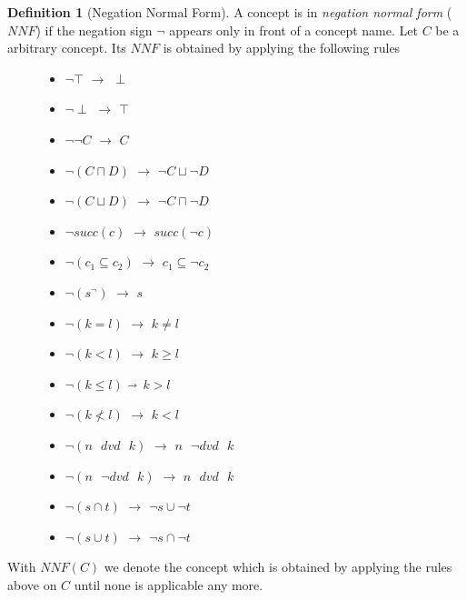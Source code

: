 \documentclass[a4paper,11pt]{scrartcl}
\theoremstyle{break}
\theoremstyle{definition}
\newtheorem{mydef}{Definition}
\begin{document}
\begin{mydef}[Negation Normal Form]
A concept is in \textit{negation normal form} ($NNF$) if the negation sign $\neg$ appears only in front of a concept name. Let $C$ be a arbitrary concept. Its $NNF$ is obtained by applying the following rules
\begin{figure}
\begin{minipage}[t]{.5\textwidth}
\raggedright
\begin{itemize}
\item $\neg\top$ $\rightarrow$ $\perp$
\item $\neg\perp$ $\rightarrow$ $\top$
\item $\neg\neg C$ $\rightarrow$ $C$
\item $\neg(C\sqcap D)$ $\rightarrow$ $\neg C \sqcup \neg D$
\item $\neg(C\sqcup D)$ $\rightarrow$ $\neg C \sqcap \neg D$
\item $\neg succ(c)$ $\rightarrow$ $succ(\neg c)$
\item $\neg (c_1\subseteq c_2)$ $\rightarrow$ $c_1\subseteq \neg c_2$
\item $\neg (s^\neg)$ $\rightarrow$ $s$
\end{itemize}
\end{minipage}%
\begin{minipage}[t]{.5\textwidth}
\raggedleft
\begin{itemize}
\item $\neg (k=l)$ $\rightarrow$ $k\neq l$
\item $\neg (k<l)$ $\rightarrow$ $k\geq l$
\item $\neg (k\leq l)$ $\shortrightarrow$ $k>l$
\item $\neg (k\not<l)$ $\rightarrow$ $k<l$
\item $\neg (n\text{ } dvd \text{ } k)$ $\rightarrow$ $n\text{ } \neg dvd \text{ } k$
\item $\neg (n\text{ } \neg dvd \text{ } k)$ $\rightarrow$ $n\text{ } dvd \text{ } k$
\item $\neg (s\cap t)$ $\rightarrow$ $\neg s \cup \neg t$
\item $\neg (s\cup t)$ $\rightarrow$ $\neg s \cap \neg t$
\end{itemize}
\end{minipage}
\end{figure}
\end{mydef}
With $NNF(C)$ we denote the concept which is obtained by applying the rules above on $C$ until none is applicable any more.\\
\end{document}
